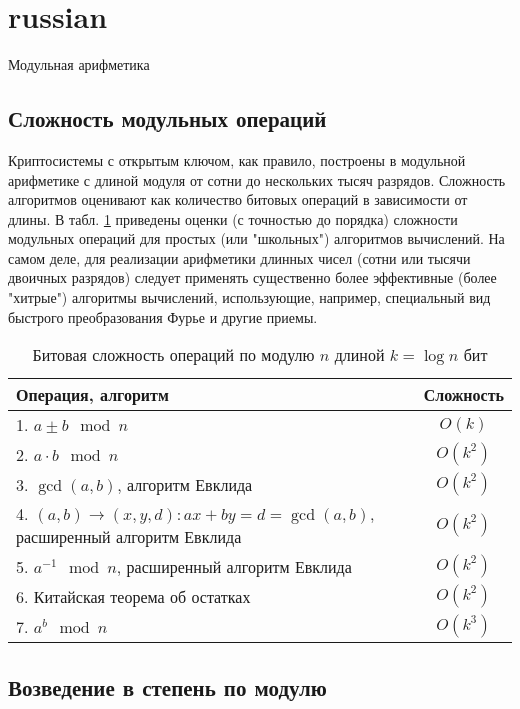 \section{russian}{Модульная арифметика}

\subsection{Сложность модульных операций}

Криптосистемы с открытым ключом, как правило, построены в модульной арифметике с  длиной модуля от сотни до нескольких тысяч разрядов. Сложность алгоритмов оценивают как количество битовых операций в зависимости от длины. В табл. \ref{tab:mod-binary-complexity} приведены оценки (с точностью до порядка) сложности модульных операций для простых (или "школьных") алгоритмов вычислений. На самом деле, для реализации арифметики длинных чисел (сотни или тысячи двоичных разрядов) следует применять существенно более эффективные (более "хитрые") алгоритмы вычислений, использующие, например, специальный вид быстрого преобразования Фурье и другие приемы.

\begin{table}[h!]
    \centering
    \caption{Битовая сложность операций по модулю $n$ длиной $k= \log n$ бит\label{tab:mod-binary-complexity}}
    \begin{tabular}{| p{} | c |}
        \hline
        Операция, алгоритм & Сложность \\
        \hline
        1. $a \pm b \mod n$ & $O(k)$ \\
        2. $a \cdot b \mod n$ & $O(k^2)$ \\
        3. $\gcd(a, b)$, алгоритм Евклида & $O(k^2)$ \\
        4. $(a,b) \rightarrow (x,y,d) : ax + by = d = \gcd(a,b)$, расширенный алгоритм Евклида & $O(k^2)$ \\
        5. $a^{-1} \mod n$, расширенный алгоритм Евклида & $O(k^2)$ \\
        6. Китайская теорема об остатках & $O(k^2)$ \\
        7. $a^b \mod n$ & $O(k^3)$ \\
        \hline
    \end{tabular}

\end{table}


\subsection{Возведение в степень по модулю}

